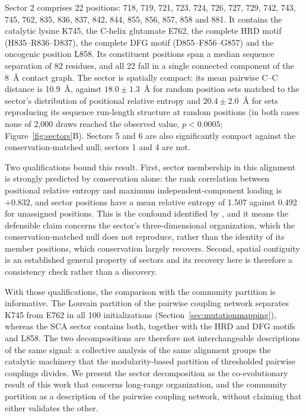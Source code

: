 \documentclass[utf8]{FrontiersinHarvard}
\begin{document}
Sector 2 comprises 22 positions: 718, 719, 721, 723, 724, 726, 727, 729, 742, 743, 745, 762, 835, 836, 837, 842, 844, 855, 856, 857, 858 and 881. It contains the catalytic lysine K745, the \textalpha{}C-helix glutamate E762, the complete HRD motif (H835--R836--D837), the complete DFG motif (D855--F856--G857) and the oncogenic position L858. Its constituent positions span a median sequence separation of 82 residues, and all 22 fall in a single connected component of the 8~\AA{} contact graph. The sector is spatially compact: its mean pairwise C\textalpha{}--C\textalpha{} distance is 10.9~\AA{}, against $18.0 \pm 1.3$~\AA{} for random position sets matched to the sector's distribution of positional relative entropy and $20.4 \pm 2.0$~\AA{} for sets reproducing its sequence run-length structure at random positions (in both cases none of 2,000 draws reached the observed value, $p < 0.0005$; Figure~\ref{fig:sectors}B). Sectors 5 and 6 are also significantly compact against the conservation-matched null; sectors 1 and 4 are not.

Two qualifications bound this result. First, sector membership in this alignment is strongly predicted by conservation alone: the rank correlation between positional relative entropy and maximum independent-component loading is $+0.832$, and sector positions have a mean relative entropy of 1.507 against 0.492 for unassigned positions. This is the confound identified by \citet{Tesileanu2015}, and it means the defensible claim concerns the sector's three-dimensional organization, which the conservation-matched null does not reproduce, rather than the identity of its member positions, which conservation largely recovers. Second, spatial contiguity is an established general property of sectors \citep{Halabi2009} and its recovery here is therefore a consistency check rather than a discovery.

With those qualifications, the comparison with the community partition is informative. The Louvain partition of the pairwise coupling network separates K745 from E762 in all 100 initializations (Section~\ref{sec:mutationmapping}), whereas the SCA sector contains both, together with the HRD and DFG motifs and L858. The two decompositions are therefore not interchangeable descriptions of the same signal: a collective analysis of the same alignment groups the catalytic machinery that the modularity-based partition of thresholded pairwise couplings divides. We present the sector decomposition as the co-evolutionary result of this work that concerns long-range organization, and the community partition as a description of the pairwise coupling network, without claiming that either validates the other.
\end{document}
